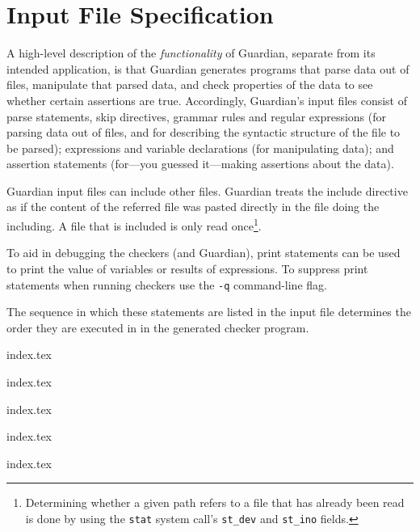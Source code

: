 
\chapter{Input File Specification}
{
	A high-level description of the \textit{functionality} of Guardian, separate
	from its intended application, is that Guardian generates programs that
	parse data out of files, manipulate that parsed data, and check
	properties of the data to see whether certain assertions are true.
	Accordingly, Guardian's input files
	consist of parse statements, skip directives, grammar rules and regular
	expressions (for
	parsing data out of files, and for describing the syntactic structure of
	the file to be parsed); expressions and variable declarations
	(for manipulating data); and assertion
	statements (for---you guessed it---making assertions about the data).
	
	Guardian input files can include other files. Guardian treats the
	include directive as if the content of the referred file was pasted
	directly in the file doing the including. A file that is included is
	only read
	once\footnote{Determining whether a given path refers to a file that has
	already been read is done by using the \texttt{stat} system
	call's \texttt{st\_dev} and \texttt{st\_ino} fields.}.
	
	To aid in debugging the checkers (and Guardian), print
	statements can be used to print the value of variables or
	results of expressions. To suppress print statements when running
	checkers use
	the \texttt{-q} command-line flag.
	
	The sequence in which these statements
	are listed in the input file determines the
	order they are executed in in the generated checker program.
	
	{index.tex}
	
	{index.tex}
	
	{index.tex}
	
	{index.tex}
	
	{index.tex}
}










